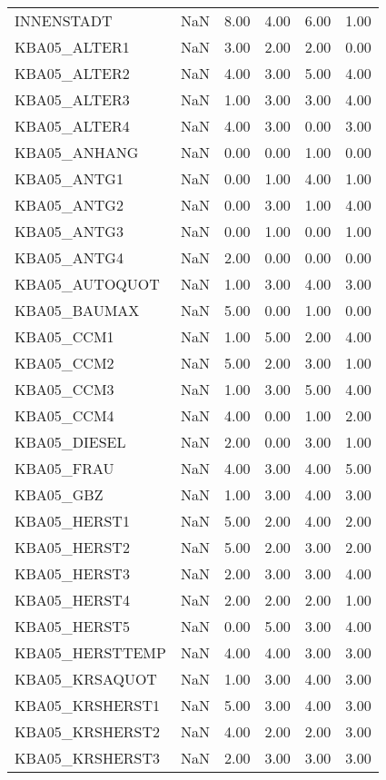 \begin{longtable}{lp{1cm}p{1cm}p{1cm}p{1cm}p{1cm}}
INNENSTADT & NaN & 8.00 & 4.00 & 6.00 & 1.00 \\
KBA05\_ALTER1  & NaN & 3.00 & 2.00 & 2.00 & 0.00 \\
KBA05\_ALTER2  & NaN & 4.00 & 3.00 & 5.00 & 4.00 \\
KBA05\_ALTER3  & NaN & 1.00 & 3.00 & 3.00 & 4.00 \\
KBA05\_ALTER4  & NaN & 4.00 & 3.00 & 0.00 & 3.00 \\
KBA05\_ANHANG  & NaN & 0.00 & 0.00 & 1.00 & 0.00 \\
KBA05\_ANTG1 & NaN & 0.00 & 1.00 & 4.00 & 1.00 \\
KBA05\_ANTG2 & NaN & 0.00 & 3.00 & 1.00 & 4.00 \\
KBA05\_ANTG3 & NaN & 0.00 & 1.00 & 0.00 & 1.00 \\
KBA05\_ANTG4 & NaN & 2.00 & 0.00 & 0.00 & 0.00 \\
KBA05\_AUTOQUOT   & NaN & 1.00 & 3.00 & 4.00 & 3.00 \\
KBA05\_BAUMAX  & NaN & 5.00 & 0.00 & 1.00 & 0.00 \\
KBA05\_CCM1 & NaN & 1.00 & 5.00 & 2.00 & 4.00 \\
KBA05\_CCM2 & NaN & 5.00 & 2.00 & 3.00 & 1.00 \\
KBA05\_CCM3 & NaN & 1.00 & 3.00 & 5.00 & 4.00 \\
KBA05\_CCM4 & NaN & 4.00 & 0.00 & 1.00 & 2.00 \\
KBA05\_DIESEL  & NaN & 2.00 & 0.00 & 3.00 & 1.00 \\
KBA05\_FRAU & NaN & 4.00 & 3.00 & 4.00 & 5.00 \\
KBA05\_GBZ & NaN & 1.00 & 3.00 & 4.00 & 3.00 \\
KBA05\_HERST1  & NaN & 5.00 & 2.00 & 4.00 & 2.00 \\
KBA05\_HERST2  & NaN & 5.00 & 2.00 & 3.00 & 2.00 \\
KBA05\_HERST3  & NaN & 2.00 & 3.00 & 3.00 & 4.00 \\
KBA05\_HERST4  & NaN & 2.00 & 2.00 & 2.00 & 1.00 \\
KBA05\_HERST5  & NaN & 0.00 & 5.00 & 3.00 & 4.00 \\
KBA05\_HERSTTEMP  & NaN & 4.00 & 4.00 & 3.00 & 3.00 \\
KBA05\_KRSAQUOT   & NaN & 1.00 & 3.00 & 4.00 & 3.00 \\
KBA05\_KRSHERST1  & NaN & 5.00 & 3.00 & 4.00 & 3.00 \\
KBA05\_KRSHERST2  & NaN & 4.00 & 2.00 & 2.00 & 3.00 \\
KBA05\_KRSHERST3  & NaN & 2.00 & 3.00 & 3.00 & 3.00 \\

\end{longtable}
